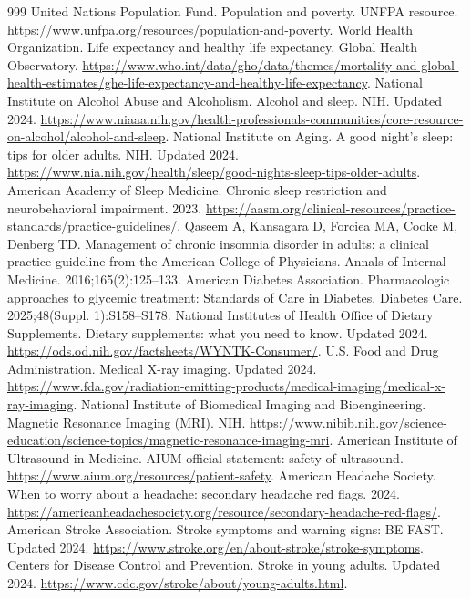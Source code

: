 \documentclass[11pt,oneside]{book}
\begin{document}
\begin{thebibliography}{999}
United Nations Population Fund. Population and poverty. UNFPA resource. \url{https://www.unfpa.org/resources/population-and-poverty}.
World Health Organization. Life expectancy and healthy life expectancy. Global Health Observatory. \url{https://www.who.int/data/gho/data/themes/mortality-and-global-health-estimates/ghe-life-expectancy-and-healthy-life-expectancy}.
National Institute on Alcohol Abuse and Alcoholism. Alcohol and sleep. NIH. Updated 2024. \url{https://www.niaaa.nih.gov/health-professionals-communities/core-resource-on-alcohol/alcohol-and-sleep}.
National Institute on Aging. A good night's sleep: tips for older adults. NIH. Updated 2024. \url{https://www.nia.nih.gov/health/sleep/good-nights-sleep-tips-older-adults}.
American Academy of Sleep Medicine. Chronic sleep restriction and neurobehavioral impairment. 2023. \url{https://aasm.org/clinical-resources/practice-standards/practice-guidelines/}.
Qaseem A, Kansagara D, Forciea MA, Cooke M, Denberg TD. Management of chronic insomnia disorder in adults: a clinical practice guideline from the American College of Physicians. Annals of Internal Medicine. 2016;165(2):125--133.
American Diabetes Association. Pharmacologic approaches to glycemic treatment: Standards of Care in Diabetes. Diabetes Care. 2025;48(Suppl. 1):S158--S178.
National Institutes of Health Office of Dietary Supplements. Dietary supplements: what you need to know. Updated 2024. \url{https://ods.od.nih.gov/factsheets/WYNTK-Consumer/}.
U.S. Food and Drug Administration. Medical X-ray imaging. Updated 2024. \url{https://www.fda.gov/radiation-emitting-products/medical-imaging/medical-x-ray-imaging}.
National Institute of Biomedical Imaging and Bioengineering. Magnetic Resonance Imaging (MRI). NIH. \url{https://www.nibib.nih.gov/science-education/science-topics/magnetic-resonance-imaging-mri}.
American Institute of Ultrasound in Medicine. AIUM official statement: safety of ultrasound. \url{https://www.aium.org/resources/patient-safety}.
American Headache Society. When to worry about a headache: secondary headache red flags. 2024. \url{https://americanheadachesociety.org/resource/secondary-headache-red-flags/}.
American Stroke Association. Stroke symptoms and warning signs: BE FAST. Updated 2024. \url{https://www.stroke.org/en/about-stroke/stroke-symptoms}.
Centers for Disease Control and Prevention. Stroke in young adults. Updated 2024. \url{https://www.cdc.gov/stroke/about/young-adults.html}.

\end{thebibliography}
\end{document}
